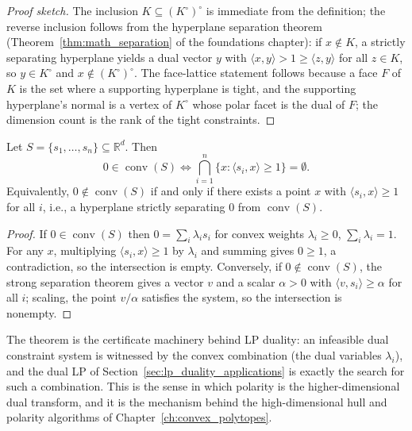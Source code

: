 \begin{proof}[Proof sketch]
  The inclusion $K \subseteq (K^\circ)^\circ$ is immediate from the
  definition; the reverse inclusion follows from the hyperplane separation
  theorem (Theorem~\ref{thm:math_separation} of the foundations chapter):
  if $x \notin K$, a strictly separating hyperplane yields a dual vector $y$
  with $\langle x, y \rangle > 1 \ge \langle z, y \rangle$ for all
  $z \in K$, so $y \in K^\circ$ and $x \notin (K^\circ)^\circ$. The
  face-lattice statement follows because a face $F$ of $K$ is the set where
  a supporting hyperplane is tight, and the supporting hyperplane's normal
  is a vertex of $K^\circ$ whose polar facet is the dual of $F$; the
  dimension count is the rank of the tight constraints.
\end{proof}

\begin{theorem}\label{thm:geo_duality_zero_in_conv}
  Let $S = \{s_1, \dots, s_n\} \subseteq \mathbb{R}^d$. Then
  \[
    0 \in \operatorname{conv}(S)
    \iff
    \bigcap_{i=1}^n \{ x : \langle s_i, x \rangle \ge 1 \} = \emptyset .
  \]
  Equivalently, $0 \notin \operatorname{conv}(S)$ if and only if there
  exists a point $x$ with $\langle s_i, x \rangle \ge 1$ for all $i$, i.e.,
  a hyperplane strictly separating $0$ from $\operatorname{conv}(S)$.
\end{theorem}

\begin{proof}
  If $0 \in \operatorname{conv}(S)$ then $0 = \sum_i \lambda_i s_i$ for
  convex weights $\lambda_i \ge 0$, $\sum_i \lambda_i = 1$. For any $x$,
  multiplying $\langle s_i, x \rangle \ge 1$ by $\lambda_i$ and summing
  gives $0 \ge 1$, a contradiction, so the intersection is empty.
  Conversely, if $0 \notin \operatorname{conv}(S)$, the strong separation
  theorem gives a vector $v$ and a scalar $\alpha > 0$ with
  $\langle v, s_i \rangle \ge \alpha$ for all $i$; scaling, the point
  $v/\alpha$ satisfies the system, so the intersection is nonempty.
\end{proof}

The theorem is the certificate machinery behind LP duality: an infeasible
dual constraint system is witnessed by the convex combination (the dual
variables $\lambda_i$), and the dual LP of
Section~\ref{sec:lp_duality_applications} is exactly the search for such a
combination. This is the sense in which polarity is the
higher-dimensional dual transform, and it is the mechanism behind the
high-dimensional hull and polarity algorithms of
Chapter~\ref{ch:convex_polytopes}.

